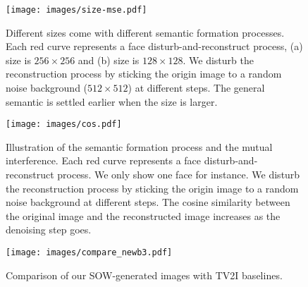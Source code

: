 \vspace{-1cm}
\begin{figure}[!h]
    \centering
    \texttt{[image: images/size-mse.pdf]}
    \caption{Different sizes come with different semantic formation processes. Each red curve represents a face disturb-and-reconstruct process, (a) size is $256 \times 256$ and (b) size is $128 \times 128$. We disturb the reconstruction process by sticking the origin image to a random noise background ($512 \times 512$) at different steps. The general semantic is settled earlier when the size is larger.}
    \label{fig:size-mse}
\end{figure}
\vspace{-10cm}
\begin{figure}[!h]
    \centering
    \texttt{[image: images/cos.pdf]}
    \caption{Illustration of the semantic formation process and the mutual interference. Each red curve represents a face disturb-and-reconstruct process. We only show one face for instance. We disturb the reconstruction process by sticking the origin image to a random noise background at different steps. The cosine similarity between the original image and the reconstructed image increases as the denoising step goes. 
    }
    \label{fig:measure_influence_along_denoise_process}
\end{figure}
 \begin{figure*}[!t]
    \centering
    \texttt{[image: images/compare\_newb3.pdf]}
    \caption{Comparison of our SOW-generated images with TV2I baselines.}
    \label{compare}
\end{figure*}


